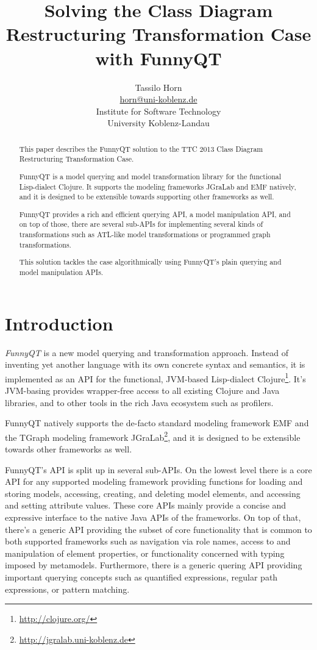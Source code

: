 \documentclass[11pt]{article}
\title{Solving the Class Diagram Restructuring Transformation Case with FunnyQT}
\author{Tassilo Horn\\
  \href{mailto:horn@uni-koblenz.de}{horn@uni-koblenz.de}\\
  Institute for Software Technology\\
  University Koblenz-Landau}
\begin{document}
\maketitle

\begin{abstract}
  This paper describes the FunnyQT solution to the TTC 2013 Class Diagram
  Restructuring Transformation Case.

  FunnyQT is a model querying and model transformation library for the
  functional Lisp-dialect Clojure.  It supports the modeling frameworks JGraLab
  and EMF natively, and it is designed to be extensible towards supporting
  other frameworks as well.

  FunnyQT provides a rich and efficient querying API, a model manipulation API,
  and on top of those, there are several sub-APIs for implementing several
  kinds of transformations such as ATL-like model transformations or programmed
  graph transformations.

  This solution tackles the case algorithmically using FunnyQT's plain querying
  and model manipulation APIs.
\end{abstract}

\section{Introduction}
\label{sec:introduction}

\emph{FunnyQT} is a new model querying and transformation approach.  Instead of
inventing yet another language with its own concrete syntax and semantics, it
is implemented as an API for the functional, JVM-based Lisp-dialect
Clojure\footnote{\url{http://clojure.org/}}.  It's JVM-basing provides
wrapper-free access to all existing Clojure and Java libraries, and to other
tools in the rich Java ecosystem such as profilers.

FunnyQT natively supports the de-facto standard modeling framework EMF
\cite{Steinberg2008EEM} and the TGraph modeling framework
JGraLab\footnote{\url{http://jgralab.uni-koblenz.de}}, and it is designed to be
extensible towards other frameworks as well.

FunnyQT's API is split up in several sub-APIs.  On the lowest level there is a
core API for any supported modeling framework providing functions for loading
and storing models, accessing, creating, and deleting model elements, and
accessing and setting attribute values.  These core APIs mainly provide a
concise and expressive interface to the native Java APIs of the frameworks.  On
top of that, there's a generic API providing the subset of core functionality
that is common to both supported frameworks such as navigation via role names,
access to and manipulation of element properties, or functionality concerned
with typing imposed by metamodels.  Furthermore, there is a generic quering API
providing important querying concepts such as quantified expressions, regular
path expressions, or pattern matching.
\end{document}
